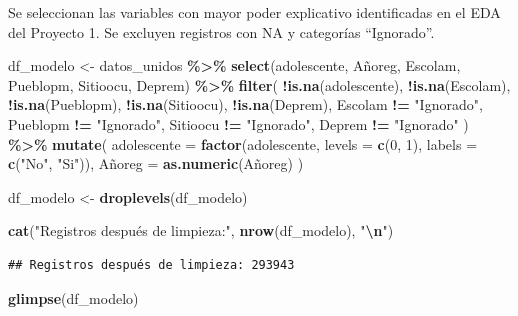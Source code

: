 \documentclass[
]{article}
\newenvironment{Shaded}{\begin{snugshade}}{\end{snugshade}}
\newcommand{\AttributeTok}[1]{\textcolor[rgb]{0.13,0.29,0.53}{#1}}
\newcommand{\DecValTok}[1]{\textcolor[rgb]{0.00,0.00,0.81}{#1}}
\newcommand{\FunctionTok}[1]{\textcolor[rgb]{0.13,0.29,0.53}{\textbf{#1}}}
\newcommand{\NormalTok}[1]{#1}
\newcommand{\OtherTok}[1]{\textcolor[rgb]{0.56,0.35,0.01}{#1}}
\newcommand{\SpecialCharTok}[1]{\textcolor[rgb]{0.81,0.36,0.00}{\textbf{#1}}}
\newcommand{\StringTok}[1]{\textcolor[rgb]{0.31,0.60,0.02}{#1}}
\begin{document}
Se seleccionan las variables con mayor poder explicativo identificadas
en el EDA del Proyecto 1. Se excluyen registros con NA y categorías
``Ignorado''.

\begin{Shaded}
\begin{Highlighting}[]
\NormalTok{df\_modelo }\OtherTok{\textless{}{-}}\NormalTok{ datos\_unidos }\SpecialCharTok{\%\textgreater{}\%}
  \FunctionTok{select}\NormalTok{(adolescente, Añoreg, Escolam, Pueblopm, Sitioocu, Deprem) }\SpecialCharTok{\%\textgreater{}\%}
  \FunctionTok{filter}\NormalTok{(}
    \SpecialCharTok{!}\FunctionTok{is.na}\NormalTok{(adolescente),}
    \SpecialCharTok{!}\FunctionTok{is.na}\NormalTok{(Escolam),}
    \SpecialCharTok{!}\FunctionTok{is.na}\NormalTok{(Pueblopm),}
    \SpecialCharTok{!}\FunctionTok{is.na}\NormalTok{(Sitioocu),}
    \SpecialCharTok{!}\FunctionTok{is.na}\NormalTok{(Deprem),}
\NormalTok{    Escolam  }\SpecialCharTok{!=} \StringTok{"Ignorado"}\NormalTok{,}
\NormalTok{    Pueblopm }\SpecialCharTok{!=} \StringTok{"Ignorado"}\NormalTok{,}
\NormalTok{    Sitioocu }\SpecialCharTok{!=} \StringTok{"Ignorado"}\NormalTok{,}
\NormalTok{    Deprem   }\SpecialCharTok{!=} \StringTok{"Ignorado"}
\NormalTok{  ) }\SpecialCharTok{\%\textgreater{}\%}
  \FunctionTok{mutate}\NormalTok{(}
    \AttributeTok{adolescente =} \FunctionTok{factor}\NormalTok{(adolescente, }\AttributeTok{levels =} \FunctionTok{c}\NormalTok{(}\DecValTok{0}\NormalTok{, }\DecValTok{1}\NormalTok{), }\AttributeTok{labels =} \FunctionTok{c}\NormalTok{(}\StringTok{"No"}\NormalTok{, }\StringTok{"Si"}\NormalTok{)),}
\NormalTok{    Añoreg      }\OtherTok{=} \FunctionTok{as.numeric}\NormalTok{(Añoreg)}
\NormalTok{  )}

\NormalTok{df\_modelo }\OtherTok{\textless{}{-}} \FunctionTok{droplevels}\NormalTok{(df\_modelo)}

\FunctionTok{cat}\NormalTok{(}\StringTok{"Registros después de limpieza:"}\NormalTok{, }\FunctionTok{nrow}\NormalTok{(df\_modelo), }\StringTok{"}\SpecialCharTok{\textbackslash{}n}\StringTok{"}\NormalTok{)}
\end{Highlighting}
\end{Shaded}

\begin{verbatim}
## Registros después de limpieza: 293943
\end{verbatim}

\begin{Shaded}
\begin{Highlighting}[]
\FunctionTok{glimpse}\NormalTok{(df\_modelo)}
\end{Highlighting}
\end{Shaded}
\end{document}
